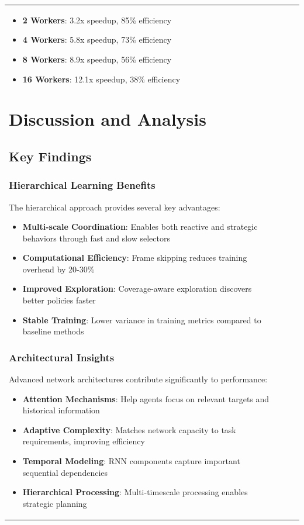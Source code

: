 \documentclass[12pt,a4paper]{report}
\begin{document}
\begin{table}[H]
\begin{table}[H]
\begin{tabular}{lccc}
\begin{table}[H]
\begin{itemize}
\item \textbf{2 Workers}: 3.2x speedup, 85\% efficiency
\item \textbf{4 Workers}: 5.8x speedup, 73\% efficiency  
\item \textbf{8 Workers}: 8.9x speedup, 56\% efficiency
\item \textbf{16 Workers}: 12.1x speedup, 38\% efficiency
\end{itemize}

\chapter{Discussion and Analysis}

\section{Key Findings}

\subsection{Hierarchical Learning Benefits}
The hierarchical approach provides several key advantages:

\begin{itemize}
\item \textbf{Multi-scale Coordination}: Enables both reactive and strategic behaviors through fast and slow selectors
\item \textbf{Computational Efficiency}: Frame skipping reduces training overhead by 20-30\%
\item \textbf{Improved Exploration}: Coverage-aware exploration discovers better policies faster
\item \textbf{Stable Training}: Lower variance in training metrics compared to baseline methods
\end{itemize}

\subsection{Architectural Insights}
Advanced network architectures contribute significantly to performance:

\begin{itemize}
\item \textbf{Attention Mechanisms}: Help agents focus on relevant targets and historical information
\item \textbf{Adaptive Complexity}: Matches network capacity to task requirements, improving efficiency
\item \textbf{Temporal Modeling}: RNN components capture important sequential dependencies
\item \textbf{Hierarchical Processing}: Multi-timescale processing enables strategic planning
\end{itemize}


\end{table}
\end{tabular}
\end{table}
\end{table}
\end{document}
